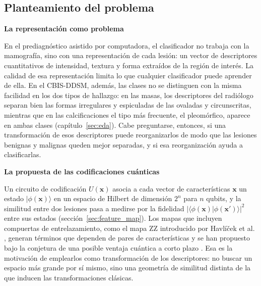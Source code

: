 
\subsection{Planteamiento del problema}
\label{sec:planteamiento}

\textbf{La representación como problema}

En el prediagnóstico asistido por computadora, el clasificador no trabaja con la mamografía, sino
con una representación de cada lesión: un vector de descriptores cuantitativos de intensidad,
textura y forma extraídos de la región de interés. La calidad de esa representación limita lo que
cualquier clasificador puede aprender de ella. En el CBIS-DDSM, además, las clases no se distinguen
con la misma facilidad en los dos tipos de hallazgo: en las masas, los descriptores del radiólogo
separan bien las formas irregulares y espiculadas de las ovaladas y circunscritas, mientras que en
las calcificaciones el tipo más frecuente, el pleomórfico, aparece en ambas clases
(capítulo~\ref{sec:eda}). Cabe preguntarse, entonces, si una transformación de esos descriptores
puede reorganizarlos de modo que las lesiones benignas y malignas queden mejor separadas, y si esa
reorganización ayuda a clasificarlas.

\textbf{La propuesta de las codificaciones cuánticas}

Un circuito de codificación $U(\mathbf{x})$ asocia a cada vector de características $\mathbf{x}$ un
estado $|\phi(\mathbf{x})\rangle$ en un espacio de Hilbert de dimensión $2^n$ para $n$ qubits, y la
similitud entre dos lesiones pasa a medirse por la fidelidad
$|\langle\phi(\mathbf{x})|\phi(\mathbf{x}')\rangle|^2$ entre sus estados
(sección~\ref{sec:feature_map}). Los mapas que incluyen compuertas de entrelazamiento, como el
mapa ZZ introducido por Havlíček et al. \cite{havlicek2019supervised}, generan términos que dependen
de pares de características y se han propuesto bajo la conjetura de una posible ventaja cuántica a
corto plazo \cite{AlvarezEstevez2024QuantumKernelBench}. Esa es la motivación de emplearlos como
transformación de los descriptores: no buscar un espacio más grande por sí mismo, sino una geometría
de similitud distinta de la que inducen las transformaciones clásicas.

